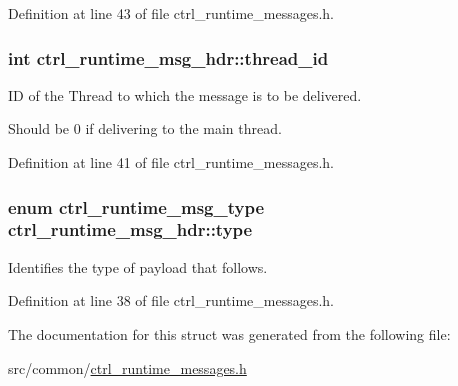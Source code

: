 Definition at line 43 of file ctrl\-\_\-runtime\-\_\-messages.\-h.

\hypertarget{structctrl__runtime__msg__hdr_a43dc841753e857ee2a825e3c253644df}{
\subsubsection[{thread\-\_\-id}]{\setlength{\rightskip}{0pt plus 5cm}int ctrl\-\_\-runtime\-\_\-msg\-\_\-hdr\-::thread\-\_\-id}}\label{structctrl__runtime__msg__hdr_a43dc841753e857ee2a825e3c253644df}


I\-D of the Thread to which the message is to be delivered. 

Should be 0 if delivering to the main thread. 

Definition at line 41 of file ctrl\-\_\-runtime\-\_\-messages.\-h.

\hypertarget{structctrl__runtime__msg__hdr_a765e6683d264c80a950d44f9e6936fcf}{
\subsubsection[{type}]{\setlength{\rightskip}{0pt plus 5cm}enum {\bf ctrl\-\_\-runtime\-\_\-msg\-\_\-type} ctrl\-\_\-runtime\-\_\-msg\-\_\-hdr\-::type}}\label{structctrl__runtime__msg__hdr_a765e6683d264c80a950d44f9e6936fcf}


Identifies the type of payload that follows. 



Definition at line 38 of file ctrl\-\_\-runtime\-\_\-messages.\-h.



The documentation for this struct was generated from the following file\-:\begin{DoxyCompactItemize}
\item 
src/common/\hyperlink{ctrl__runtime__messages_8h}{ctrl\-\_\-runtime\-\_\-messages.\-h}\end{DoxyCompactItemize}
